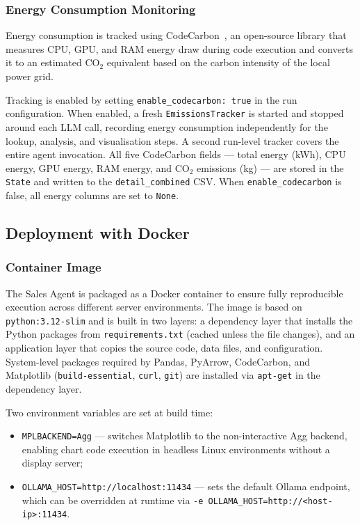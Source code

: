 \documentclass[11pt,a4paper]{article}
\begin{document}
\subsubsection{Energy Consumption Monitoring}

Energy consumption is tracked using CodeCarbon~\cite{lottick2019codecarbon}, an
open-source library that measures CPU, GPU, and RAM energy draw during code
execution and converts it to an estimated CO$_2$ equivalent based on the carbon
intensity of the local power grid.

Tracking is enabled by setting \texttt{enable\_codecarbon: true} in the run
configuration. When enabled, a fresh \texttt{EmissionsTracker} is started and
stopped around each LLM call, recording energy consumption independently for the
lookup, analysis, and visualisation steps. A second run-level tracker covers the
entire agent invocation. All five CodeCarbon fields — total energy (kWh), CPU
energy, GPU energy, RAM energy, and CO$_2$ emissions (kg) — are stored in the
\texttt{State} and written to the \texttt{detail\_combined} CSV. When
\texttt{enable\_codecarbon} is false, all energy columns are set to \texttt{None}.

\subsection{Deployment with Docker}
\label{subsec:docker}

\subsubsection{Container Image}

The Sales Agent is packaged as a Docker container to ensure fully reproducible
execution across different server environments. The image is based on
\texttt{python:3.12-slim} and is built in two layers: a dependency layer that
installs the Python packages from \texttt{requirements.txt} (cached unless the
file changes), and an application layer that copies the source code, data files,
and configuration. System-level packages required by Pandas, PyArrow, CodeCarbon,
and Matplotlib (\texttt{build-essential}, \texttt{curl}, \texttt{git}) are
installed via \texttt{apt-get} in the dependency layer.

Two environment variables are set at build time:
\begin{itemize}
    \item \texttt{MPLBACKEND=Agg} — switches Matplotlib to the non-interactive
          Agg backend, enabling chart code execution in headless Linux environments
          without a display server;
    \item \texttt{OLLAMA\_HOST=http://localhost:11434} — sets the default Ollama
          endpoint, which can be overridden at runtime via
          \texttt{-e OLLAMA\_HOST=http://<host-ip>:11434}.
\end{itemize}
\end{document}
